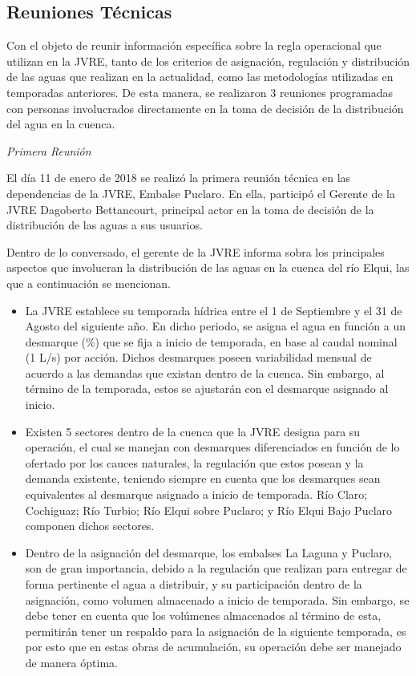 \documentclass[11pt,]{article}
\begin{document}
		\subsection{Reuniones Técnicas}
		
		Con el objeto de reunir información específica sobre la regla operacional que utilizan en la JVRE, tanto de los criterios de asignación, regulación y distribución de las aguas que realizan en la actualidad, como las metodologías utilizadas en temporadas anteriores. De esta manera, se realizaron 3 reuniones programadas con personas involucrados directamente en la toma de decisión de la distribución del agua en la cuenca. \bigskip
		
		\textit {Primera Reunión}\bigskip
		
		
		El día 11 de enero de 2018 se realizó la primera reunión técnica en las dependencias de la JVRE, Embalse Puclaro. En ella, participó el Gerente de la JVRE Dagoberto Bettancourt, principal actor en la toma de decisión de la distribución de las aguas a sus usuarios.\bigskip
		
		Dentro de lo conversado, el gerente de la JVRE informa sobra los principales aspectos que involucran la distribución de las aguas en la cuenca del río Elqui, las que a continuación se mencionan.
		
		\begin{itemize}
		
		\item La JVRE establece su temporada hídrica entre el 1 de Septiembre y el 31 de Agosto del siguiente año. En dicho periodo, se asigna el agua en función a un desmarque (\%) que se fija a inicio de temporada, en base al caudal nominal (1 L/s) por acción. Dichos desmarques poseen variabilidad mensual de acuerdo a las demandas que existan dentro de la cuenca. Sin embargo, al término de la temporada, estos se ajustarán con el desmarque asignado al inicio.
		
		\item Existen 5 sectores dentro de la cuenca que la JVRE designa para su operación, el cual se manejan con desmarques diferenciados en función de lo ofertado por los cauces naturales, la regulación que estos posean y la demanda existente, teniendo siempre en cuenta que los desmarques sean equivalentes al desmarque asignado a inicio de temporada. Río Claro; Cochiguaz; Río Turbio; Río Elqui sobre Puclaro; y Río Elqui Bajo Puclaro componen dichos sectores.
		
		\item Dentro de la asignación del desmarque, los embalses La Laguna y Puclaro, son de gran importancia, debido a la regulación que realizan para entregar de forma pertinente el agua a distribuir, y su participación dentro de la asignación, como volumen almacenado a inicio de temporada. Sin embargo, se debe tener en cuenta que los volúmenes almacenados al término de esta, permitirán tener un respaldo para la asignación de la siguiente temporada, es por esto que en estas obras de acumulación, su operación debe ser manejado de manera óptima.
		
		
		\end{itemize}		\bigskip
		
\end{document}
